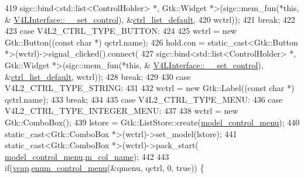 \begin{DoxyCode}
419                         sigc::bind<std::list<ControlHolder> *, Gtk::Widget *>(sigc::mem\_fun(*\textcolor{keyword}{this}, &
      \hyperlink{class_v_s_s_s___g_u_i_1_1_v4_l_interface_ad6eddc5cedbaf1b0e87b330aae937b46}{V4LInterface::\_\_set\_control}), &\hyperlink{class_v_s_s_s___g_u_i_1_1_v4_l_interface_a97faf21f7b67c8ef15ceeafa377c6ea4}{ctrl\_list\_default},
420                         wctrl));
421                         \textcolor{keywordflow}{break};
422 
423                     \textcolor{keywordflow}{case} V4L2\_CTRL\_TYPE\_BUTTON:
424 
425                         wctrl = \textcolor{keyword}{new} Gtk::Button((\textcolor{keyword}{const} \textcolor{keywordtype}{char} *) qctrl.name);
426                         hold.con = \textcolor{keyword}{static\_cast<}Gtk::Button *\textcolor{keyword}{>}(wctrl)->signal\_clicked().connect(
427                         sigc::bind<std::list<ControlHolder> *, Gtk::Widget *>(sigc::mem\_fun(*\textcolor{keyword}{this}, &
      \hyperlink{class_v_s_s_s___g_u_i_1_1_v4_l_interface_ad6eddc5cedbaf1b0e87b330aae937b46}{V4LInterface::\_\_set\_control}), &\hyperlink{class_v_s_s_s___g_u_i_1_1_v4_l_interface_a97faf21f7b67c8ef15ceeafa377c6ea4}{ctrl\_list\_default}, wctrl));
428                         \textcolor{keywordflow}{break};
429 
430                     \textcolor{keywordflow}{case} V4L2\_CTRL\_TYPE\_STRING:
431 
432                         wctrl = \textcolor{keyword}{new} Gtk::Label((\textcolor{keyword}{const} \textcolor{keywordtype}{char} *) qctrl.name);
433                         \textcolor{keywordflow}{break};
434 
435                     \textcolor{keywordflow}{case} V4L2\_CTRL\_TYPE\_MENU:
436                     \textcolor{keywordflow}{case} V4L2\_CTRL\_TYPE\_INTEGER\_MENU:
437 
438                         wctrl = \textcolor{keyword}{new} Gtk::ComboBox();
439                         lstore = Gtk::ListStore::create(\hyperlink{class_v_s_s_s___g_u_i_1_1_v4_l_interface_ac98e20c4b2875e7137f867b3da753640}{model\_control\_menu});
440                         \textcolor{keyword}{static\_cast<}Gtk::ComboBox *\textcolor{keyword}{>}(wctrl)->set\_model(lstore);
441                         \textcolor{keyword}{static\_cast<}Gtk::ComboBox *\textcolor{keyword}{>}(wctrl)->pack\_start(
      \hyperlink{class_v_s_s_s___g_u_i_1_1_v4_l_interface_ac98e20c4b2875e7137f867b3da753640}{model\_control\_menu}.\hyperlink{class_v_s_s_s___g_u_i_1_1_v4_l_interface_1_1_model_column_a96d5f652d19a139a1380d9ffc0110ed0}{m\_col\_name});
442 
443                         \textcolor{keywordflow}{if}(\hyperlink{class_v_s_s_s___g_u_i_1_1_v4_l_interface_a7ece61f4ccc6d5321c445e60f34e7f33}{vcap}.\hyperlink{classv4lcap_a9d192d856a6f4243a4a4508beef2e211}{enum\_control\_menu}(&qmenu, qctrl, 0, \textcolor{keyword}{true})) \{

\end{DoxyCode}
